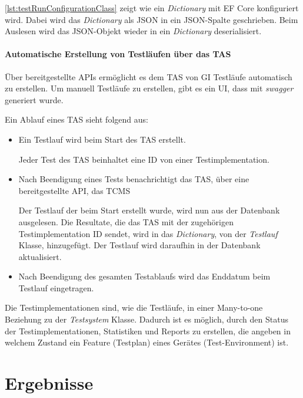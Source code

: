 \documentclass[a4paper, fontsize=11pt, parskip=half, twoside]{scrreprt}
\begin{document}
	\autoref{lst:testRunConfigurationClass} zeigt wie ein \emph{Dictionary} mit \ac{EF} Core konfiguriert wird.
	Dabei wird das \emph{Dictionary} als \ac{JSON} in ein \ac{JSON}-Spalte geschrieben.
	Beim Auslesen wird das \ac{JSON}-Objekt wieder in ein \emph{Dictionary} deserialisiert.
	
	\subsubsection{Automatische Erstellung von Testläufen über das TAS}
	Über bereitgestellte \ac{API}s ermöglicht es dem \ac{TAS} von \ac{GI} Testläufe automatisch zu erstellen.
	Um manuell Testläufe zu erstellen, gibt es ein \ac{UI}, dass mit \emph{swagger} generiert wurde.
	
	Ein Ablauf eines \ac{TAS} sieht folgend aus:
	
	\begin{itemize}
		\item Ein Testlauf wird beim Start des \ac{TAS} erstellt.
		
		Jeder Test des \ac{TAS} beinhaltet eine \ac{ID} von einer Testimplementation.
		
		\item Nach Beendigung eines Tests benachrichtigt das \ac{TAS}, über eine bereitgestellte \ac{API}, das \ac{TCMS}
		
		Der Testlauf der beim Start erstellt wurde, wird nun aus der Datenbank ausgelesen. 
		Die Resultate, die das \ac{TAS} mit der zugehörigen Testimplementation \ac{ID} sendet, wird in das \emph{Dictionary}, von der \emph{Testlauf} Klasse, hinzugefügt.
		Der Testlauf wird daraufhin in der Datenbank aktualisiert.
		
		\item Nach Beendigung des gesamten Testablaufs wird das Enddatum beim Testlauf eingetragen.
	\end{itemize}
	
	Die Testimplementationen sind, wie die Testläufe, in einer Many-to-one Beziehung zu der \emph{Testsystem} Klasse. 
	Dadurch ist es möglich, durch den Status der Testimplementationen, Statistiken und Reports zu erstellen, die angeben in welchem Zustand ein Feature (Testplan) eines Gerätes (Test-Environment) ist.
	
	
	\chapter{Ergebnisse}
	
\end{document}
